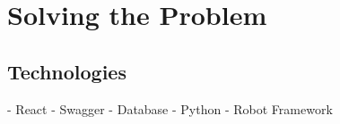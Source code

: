 \chapter{Solving the Problem} \label{Chapter:three}

\section{Technologies}

- React
- Swagger
- Database
- Python
- Robot Framework

